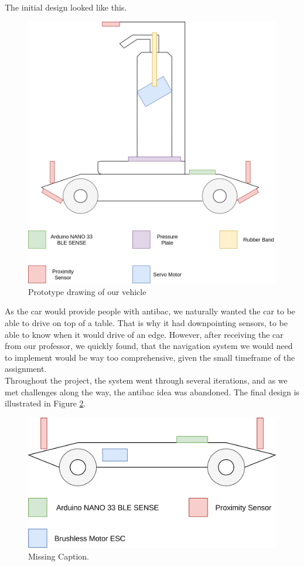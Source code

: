\documentclass{article}
\begin{document}
The initial design looked like this. 

\begin{figure}[H]
	\centering
	\includegraphics[width=\linewidth]{prototype-drawing.png}
	\caption{Prototype drawing of our vehicle}
	\label{ProtoDrawing}
\end{figure}

As the car would provide people with antibac, we naturally wanted the car to be able to drive on top of a table. That is why it had downpointing sensors, to be able to know when it would drive of an edge. However, after receiving the car from our professor, we quickly found, that the navigation system we would need to implement would be way too comprehensive, given the small timeframe of the assignment.\\ 

Throughout the project, the system went through several iterations, and as we met challenges along the way, the antibac idea was abandoned. The final design is illustrated in Figure \ref{final-design}. 

\begin{figure}[H]
	\centering
	\includegraphics[width=\linewidth]{final-design.png}
    \caption{Missing Caption.}
	\label{final-design}
\end{figure}
\end{document}
